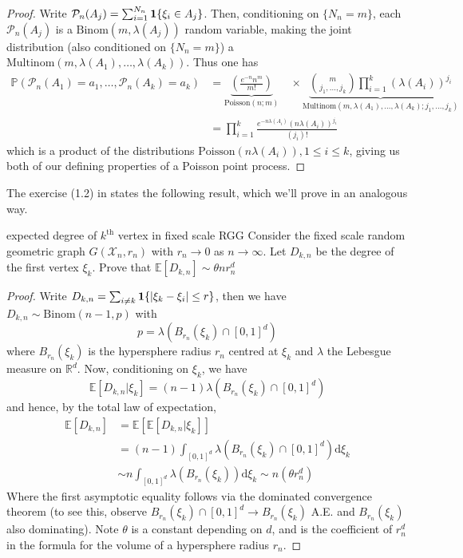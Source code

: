 \documentclass{article}
\begin{document}
\begin{proof}
Write $\mathcal{P}_n(A_j) = \sum_{i=1}^{N_n} {\bf 1}\{\xi_i \in A_j\}$. Then, conditioning on $\{N_n = m\}$, each 
$\mathcal{P}_n(A_j)$ is a $\text{Binom}(m, \lambda(A_j))$ random variable, making the joint distribution (also 
conditioned on $\{N_n = m\}$) a $\text{Multinom}(m, \lambda(A_1), \dots, \lambda(A_k))$. Thus one has 
\begin{align*}\mathbb{P}(\mathcal{P}_n(A_1) = a_1, \dots, \mathcal{P}_n(A_k) = a_k) &= 
\underbrace{\left(\frac{e^{-n}n^m}{m!}\right)}_{\text{Poisson}(n ; m)} \quad \times 
\underbrace{\binom{m}{j_1, \dots, j_k}\prod_{i=1}^k {(\lambda(A_i))}^{j_i}}_{\text{Multinom}(m, \lambda(A_1), \dots, \lambda(A_k) ; j_1, \dots, j_k)} \\
&= \prod_{i=1}^k \frac{e^{-n\lambda(A_i)}(n\lambda(A_i))^{j_i}}{(j_i)!}
\end{align*}
which is a product of the distributions $\text{Poisson}(n\lambda(A_i)), 1 \leq i \leq k$, giving us both of our 
defining properties of a Poisson point process. 
\end{proof}

The exercise (1.2) in \cite{Penrose_et_al_2016} states the following result, which we'll prove in an analogous way.

\begin{proposition}[]{expected degree of $k^\text{th}$ vertex in fixed scale RGG}
    Consider the fixed scale random geometric graph $G(\mathcal{X}_n, r_n)$ with $r_n \to 0$ as $n \to \infty$. Let 
    $D_{k, n}$ be the degree of the first vertex $\xi_k$. Prove that $\mathbb{E}[D_{k, n}] \sim \theta n r_n^d$
\end{proposition}

\begin{proof}
Write $D_{k,n} = \sum_{i \neq k} {\bf 1}\{\lvert \xi_k - \xi_i \rvert \leq r\}$, then we have $D_{k,n} \sim 
\text{Binom}(n-1, p)$ with \[p = \lambda(B_{r_n}(\xi_k) \cap [0,1]^d)\] where $B_{r_n}(\xi_k)$ is the hypersphere 
radius $r_n$ centred at $\xi_k$ and $\lambda$ the Lebesgue measure on $\mathbb{R}^d$. Now, conditioning on $\xi_k$, 
we have \[\mathbb{E}[D_{k,n} | \xi_k] = (n-1)\lambda(B_{r_n}(\xi_k) \cap [0,1]^d)\]
and hence, by the total law of expectation, 
\begin{align*}
    \mathbb{E}[D_{k,n}] &= \mathbb{E}[\mathbb{E}[D_{k,n} | \xi_k]] \\
    &= (n-1)\int_{[0,1]^d}\lambda(B_{r_n}(\xi_k) \cap [0,1]^d)\mathrm{d}\xi_k \\
    &\sim n\int_{[0,1]^d}\lambda(B_{r_n}(\xi_k))\mathrm{d}\xi_k \sim n(\theta r_n^d)
\end{align*}
Where the first asymptotic equality follows via the dominated convergence theorem (to see this, observe $B_{r_n}(\xi_k) \cap [0,1]^d 
\to B_{r_n}(\xi_k)$ A.E. and $B_{r_n}(\xi_k)$ also dominating). Note $\theta$ is a constant depending on $d$, 
and is the coefficient of $r_n^d$ in the formula for the volume of a hypersphere radius $r_n$.
\end{proof}
\end{document}
